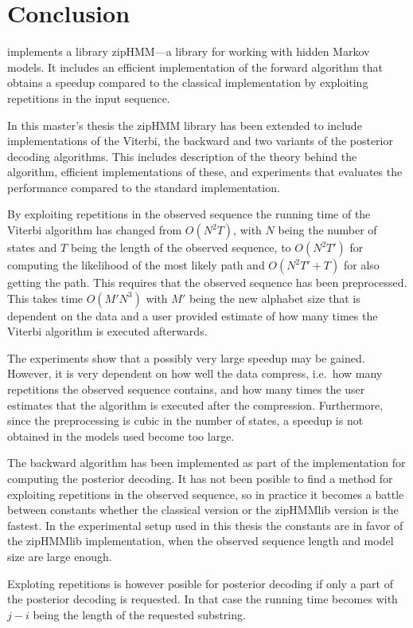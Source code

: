\chapter{Conclusion}
\label{cha:conclusion}

\citet{sand2013ziphmmlib} implements a library zipHMM---a library for working
with hidden Markov models. It includes an efficient implementation of the forward
algorithm that obtains a speedup compared to the classical implementation by
exploiting repetitions in the input sequence.

In this master's thesis the zipHMM library has been extended to include
implementations of the Viterbi, the backward and two variants of the posterior
decoding algorithms. This includes description of the theory behind the
algorithm, efficient implementations of these, and experiments that evaluates
the performance compared to the standard implementation.

By exploiting repetitions in the observed sequence the running time of the
Viterbi algorithm has changed from $O(N^2 T)$, with $N$ being the number of
states and $T$ being the length of the observed sequence, to $O(N^2 T')$ for
computing the likelihood of the most likely path and $O(N^2 T' + T)$ for also
getting the path. This requires that the observed sequence has been
preprocessed. This takes time $O(M' N^3)$ with $M'$ being the new alphabet size
that is dependent on the data and a user provided estimate of how many times
the Viterbi algorithm is executed afterwards.

The experiments show that a possibly very large speedup may be gained. However,
it is very dependent on how well the data compress, i.e.\ how many repetitions
the observed sequence contains, and how many times the user estimates that the
algorithm is executed after the compression. Furthermore, since the
preprocessing is cubic in the number of states, a speedup is not obtained in
the models used become too large.

The backward algorithm has been implemented as part of the implementation for
computing the posterior decoding. It has not been posible to find a method for
exploiting repetitions in the observed sequence, so in practice it becomes a
battle between constants whether the classical version or the zipHMMlib version
is the fastest. In the experimental setup used in this thesis the constants are
in favor of the zipHMMlib implementation, when the observed sequence length and
model size are large enough.

Exploting repetitions is however posible for posterior decoding if only a
part of the posterior decoding is requested. In that case the running time
becomes  with $j - i$ being the length of the
requested substring.

